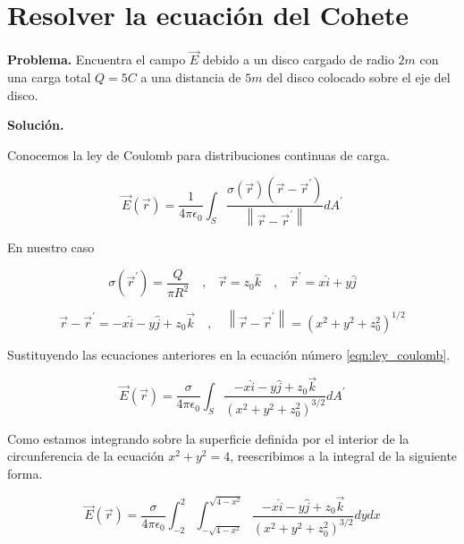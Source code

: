 \section{Resolver la ecuación del Cohete}

\vspace{0.5cm}

\noindent \textbf{Problema.} Encuentra el campo $\vec{E}$ debido a un disco cargado de 
radio $2m$ con una carga total $Q=5 C$ a una distancia de $5m$ del
disco colocado sobre el eje del disco.

\textbf{Solución.}

Conocemos la ley de Coulomb para distribuciones continuas de carga.

\begin{equation}
    \vec{E} (\vec{r}) = \frac{1}{4\pi \epsilon_0} 
    \displaystyle\int_{S} \frac{\sigma(\vec{r}) \left( \vec{r} - \vec{r}^{'}  \right) }{\left\lVert \vec{r} - \vec{r}^{'} \right\rVert } dA^{'}
    \label{eqn:ley_coulomb}
\end{equation}

En nuestro caso

\begin{equation*}
    \sigma(\vec{r}^{'}) = \frac{Q}{\pi R^2} 
    \quad \text{,} \quad
    \vec{r} = z_0 \hat{k}
    \quad \text{,} \quad
    \vec{r}^{'} = x \hat{i} + y \hat{j}
\end{equation*}

\begin{equation*}
    \vec{r} - \vec{r}^{'} =
    -x \hat{i} - y \hat{j} + z_{0} \vec{k}
    \quad , \quad
    \left\lVert \vec{r} - \vec{r}^{'} \right\rVert 
    = 
    \left( x^2 + y^2 + z_{0}^{2} \right)^{1/2}
\end{equation*}

Sustituyendo las ecuaciones anteriores en la ecuación número \ref{eqn:ley_coulomb}.

\begin{equation}
    \vec{E} (\vec{r}) = \frac{\sigma}{4\pi \epsilon_0} 
    \displaystyle\int_{S} \frac{ -x \hat{i} - y \hat{j} + z_{0} \vec{k} }{\left( x^2 + y^2 + z_{0}^{2} \right)^{3/2}} dA^{'}
\end{equation}

Como estamos integrando sobre la superficie definida por el interior de la circunferencia de la ecuación $ x^2 + y^2 = 4 $, reescribimos a la integral de la siguiente forma.

\begin{equation}
    \vec{E} (\vec{r}) = \frac{\sigma}{4\pi \epsilon_0} 
    \displaystyle\int_{-2}^{2} 
    \displaystyle\int_{- \sqrt{4 - x^2} }^{\sqrt{4 - x^2}}
    \frac{ -x \hat{i} - y \hat{j} + z_{0} \vec{k} }{\left( x^2 + y^2 + z_{0}^{2} \right)^{3/2}} dy dx
\end{equation}

